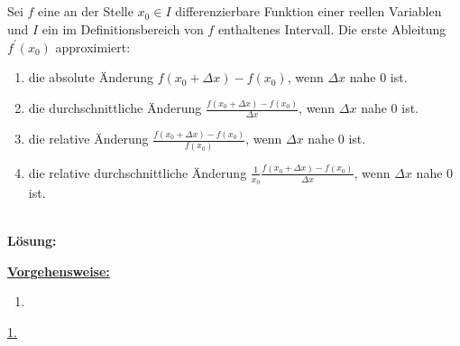 \subsection*{}
Sei $f$ eine an der Stelle $x_0 \in I $ differenzierbare Funktion einer reellen Variablen und $I$ ein im Definitionsbereich von $f$ enthaltenes Intervall. Die erste Ableitung $f^\prime(x_0)$ approximiert: 
\renewcommand{\labelenumi}{(\alph{enumi})}
\begin{enumerate}
	\item 
	die absolute Änderung $f(x_0 + \Delta x) - f(x_0)$, wenn $\Delta x$ nahe $0$ ist.
	\item
	die durchschnittliche Änderung $\frac{f(x_0 + \Delta x) - f(x_0)}{\Delta x}$, wenn $\Delta x$ nahe $0$ ist.
	\item
	die relative Änderung $\frac{f(x_0 + \Delta x) - f(x_0)}{f(x_0)}$, wenn $\Delta x$ nahe $0$ ist.
	\item
	die relative durchschnittliche Änderung $\frac{1}{x_0} \frac{f(x_0 + \Delta x) - f(x_0)}{\Delta x}$, wenn $\Delta x$ nahe $0$ ist.
\end{enumerate}
\ \\
\textbf{Lösung:}
\begin{mdframed}
\underline{\textbf{Vorgehensweise:}}
\renewcommand{\labelenumi}{\theenumi.}
\begin{enumerate}
\item 
\end{enumerate}
\end{mdframed}

\underline{1. }\\



\newpage
